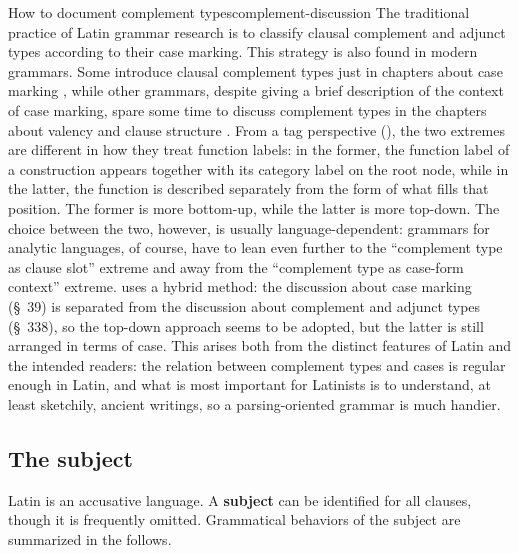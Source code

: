 \documentclass[a4paper, oneside]{report}
\newcommand*{\citesec}[1]{\S~{#1}}
\newcommand*{\citechap}[1]{chap.~{#1}}
\newcommand*{\concept}[1]{\textbf{#1}}
\begin{document}
\begin{infobox}{How to document complement types}{complement-discussion}
    The traditional practice of Latin grammar research
    is to classify clausal complement and adjunct types according to their case marking.
    This strategy is also found in modern grammars.
    Some introduce clausal complement types just in chapters about case marking 
    \citep[\citechap{8}]{jacques2021grammar},
    while other grammars, despite giving a brief description of the context of case marking,
    spare some time to discuss complement types in the chapters about valency and clause structure 
    \citep[\citesec{3.4}, \citechap{19}, \citechap{22}]{forker2020grammar}.
    From a \ac{tag} perspective (), 
    the two extremes are different in how they treat function labels:
    in the former, the function label of a construction appears together with its category label on the root node,
    while in the latter, the function is described separately from the form of what fills that position.
    The former is more bottom-up, 
    while the latter is more top-down.
    The choice between the two, however, is usually language-dependent:
    grammars for analytic languages, of course, have to lean even further to the 
    ``complement type as clause slot'' extreme 
    and away from the ``complement type as case-form context'' extreme.
    \citet{allen1903allen} uses a hybrid method:
    the discussion about case marking (\citesec{39}) is separated from 
    the discussion about complement and adjunct types (\citesec{338}),
    so the top-down approach seems to be adopted,
    but the latter is still arranged in terms of case.
    This arises both from the distinct features of Latin and the intended readers:
    the relation between complement types and cases is regular enough in Latin,
    and what is most important for Latinists is to understand, at least sketchily, ancient writings, 
    so a parsing-oriented grammar is much handier.
\end{infobox}

\subsection{The subject}

Latin is an accusative language.
A \concept{subject} can be identified for all clauses, 
though it is frequently omitted.
Grammatical behaviors of the subject are summarized in the follows.
\end{document}
